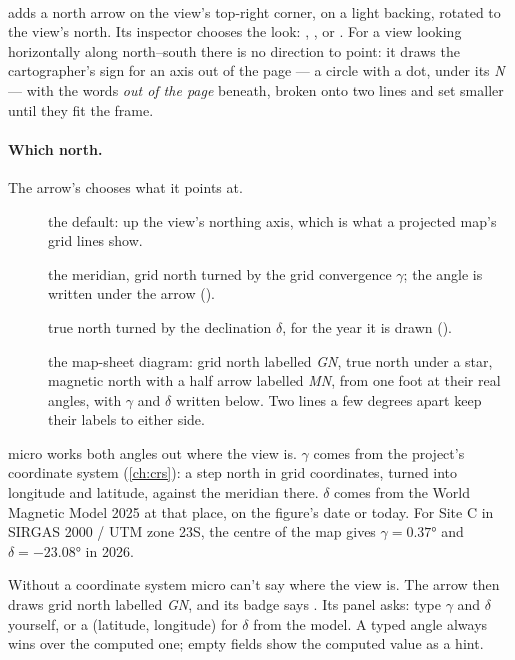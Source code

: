 \paragraph{} adds a north arrow on the view's top-right corner, on a light backing, rotated to the view's north. Its inspector chooses the look: , ,  or . For a view looking horizontally along north–south there is no direction to point: it draws the cartographer's sign for an axis out of the page — a circle with a dot, under its \emph{N} — with the words \emph{out of the page} beneath, broken onto two lines and set smaller until they fit the frame.

\paragraph{Which north.} The arrow's  chooses what it points at.
\begin{description}
\item[] the default: up the view's northing axis, which is what a projected map's grid lines show.
\item[] the meridian, grid north turned by the grid convergence $\gamma$; the angle is written under the arrow ().
\item[] true north turned by the declination $\delta$, for the year it is drawn ().
\item[] the map-sheet diagram: grid north labelled \emph{GN}, true north under a star, magnetic north with a half arrow labelled \emph{MN}, from one foot at their real angles, with $\gamma$ and $\delta$ written below. Two lines a few degrees apart keep their labels to either side.
\end{description}
micro works both angles out where the view is. $\gamma$ comes from the project's coordinate system (\cref{ch:crs}): a step north in grid coordinates, turned into longitude and latitude, against the meridian there. $\delta$ comes from the World Magnetic Model 2025 at that place, on the figure's date or today. For Site C in SIRGAS 2000 / UTM zone 23S, the centre of the map gives $\gamma = 0.37°$ and $\delta = -23.08°$ in 2026.

Without a coordinate system micro can't say where the view is. The arrow then draws grid north labelled \emph{GN}, and its badge says . Its panel asks: type $\gamma$ and $\delta$ yourself, or a  (latitude, longitude) for $\delta$ from the model. A typed angle always wins over the computed one; empty fields show the computed value as a hint.

